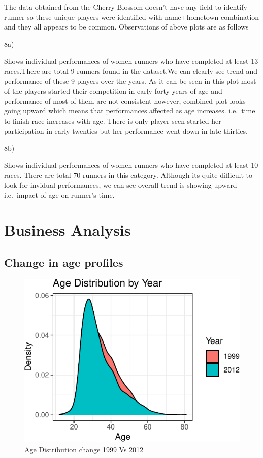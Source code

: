 \documentclass[
]{article}
\begin{document}
The data obtained from the Cherry Blossom doesn't have any field to
identify runner so these unique players were identified with
name+hometown combination and they all appears to be common.
Observations of above plots are as follows

8a)

Shows individual performances of women runners who have completed at
least 13 races.There are total 9 runners found in the dataset.We can
clearly see trend and performance of these 9 players over the years. As
it can be seen in this plot most of the players started their
competition in early forty years of age and performance of most of them
are not consistent however, combined plot looks going upward which means
that performances affected as age increases. i.e.~time to finish race
increases with age. There is only player seen started her participation
in early twenties but her performance went down in late thirties.

8b)

Shows individual performances of women runners who have completed at
least 10 races. There are total 70 runners in this category. Although
its quite difficult to look for invidual performances, we can see
overall trend is showing upward i.e.~impact of age on runner's time.

\newpage

\hypertarget{business-analysis}{%
\section{Business Analysis}\label{business-analysis}}

\hypertarget{change-in-age-profiles}{%
\subsection{Change in age profiles}\label{change-in-age-profiles}}

\begin{figure}[H]

{\centering \includegraphics{case_study02_files/figure-latex/unnamed-chunk-17-1} 

}

\caption{Age Distribution change 1999 Vs 2012}\label{fig:unnamed-chunk-17}
\end{figure}
\end{document}
